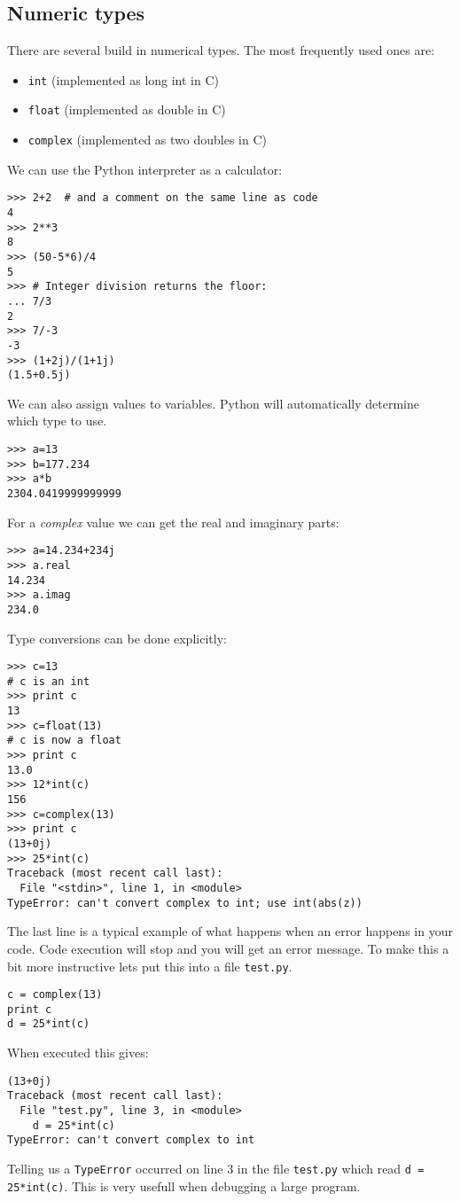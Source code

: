 \documentclass[10pt,a4paper]{article}
\begin{document}
\subsection{Numeric types}
There are several build in numerical types.
The most frequently used ones are:
\begin{itemize}
\item \verb|int| (implemented as long int in C)
\item \verb|float| (implemented as double in C)
\item \verb|complex| (implemented as two doubles in C)
\end{itemize}
We can use the Python interpreter as a calculator:
\begin{lstlisting}
>>> 2+2  # and a comment on the same line as code
4
>>> 2**3
8
>>> (50-5*6)/4
5
>>> # Integer division returns the floor:
... 7/3
2
>>> 7/-3
-3
>>> (1+2j)/(1+1j)
(1.5+0.5j)
\end{lstlisting}
We can also assign values to variables.
Python will automatically determine which type to use.
\begin{lstlisting}
>>> a=13
>>> b=177.234
>>> a*b
2304.0419999999999
\end{lstlisting}
For a \emph{complex} value we can get the real and imaginary parts:
\begin{lstlisting}
>>> a=14.234+234j
>>> a.real
14.234
>>> a.imag
234.0
\end{lstlisting}
Type conversions can be done explicitly:
\begin{lstlisting}
>>> c=13
# c is an int
>>> print c
13
>>> c=float(13)
# c is now a float
>>> print c
13.0
>>> 12*int(c)
156
>>> c=complex(13)
>>> print c
(13+0j)
>>> 25*int(c)
Traceback (most recent call last):
  File "<stdin>", line 1, in <module>
TypeError: can't convert complex to int; use int(abs(z))
\end{lstlisting}
The last line is a typical example of what happens when an error happens in your code.
Code execution will stop and you will get an error message.
To make this a bit more instructive lets put this into a file \verb|test.py|.
\begin{lstlisting}
c = complex(13)
print c
d = 25*int(c)
\end{lstlisting}
When executed this gives:
\begin{lstlisting}
(13+0j)
Traceback (most recent call last):
  File "test.py", line 3, in <module>
    d = 25*int(c)
TypeError: can't convert complex to int
\end{lstlisting}
Telling us a \verb|TypeError| occurred on line 3 in the file \verb|test.py| which read \verb|d = 25*int(c)|.
This is very usefull when debugging a large program.
\end{document}
